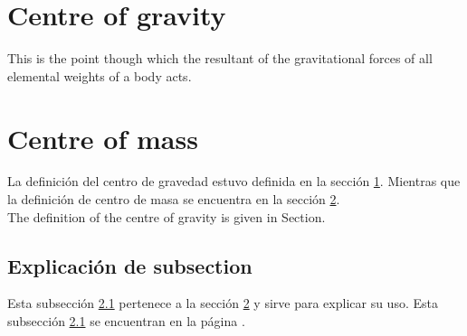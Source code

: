 \documentclass{article}
\begin{document}
\section{Centre of gravity}\label{cgravity}
This is the point though which the resultant of the gravitational forces of all elemental weights of a body acts. 

\section{Centre of mass}\label{cmass}
La definición del centro de gravedad estuvo definida en la sección \ref{cgravity}. Mientras que la definición de centro de masa se encuentra en la sección \ref{cmass}. \\

The definition of the centre of gravity is given in Section.

\subsection{Explicación de subsection}\label{expsub}
Esta subsección \ref{expsub} pertenece a la sección \ref{cmass} y sirve para explicar su uso. Esta subsección \ref{expsub} se encuentran en la página \pageref{expsub}.
\end{document}
